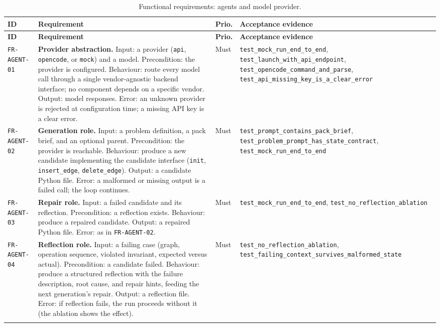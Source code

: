 \begin{longtable}{@{}>{\raggedright\arraybackslash}p{}>{\raggedright\arraybackslash}p{}p{}>{\raggedright\arraybackslash}p{}@{}}
\caption{Functional requirements: agents and model provider.}\label{tab:fr-agent}\\
\toprule
\textbf{ID} & \textbf{Requirement} & \textbf{Prio.} & \textbf{Acceptance evidence} \\
\midrule
\endfirsthead
\toprule
\textbf{ID} & \textbf{Requirement} & \textbf{Prio.} & \textbf{Acceptance evidence} \\
\midrule
\endhead
\bottomrule
\endfoot

\texttt{FR-AGENT-01} & \textbf{Provider abstraction.} Input: a provider
(\texttt{api}, \texttt{opencode}, or \texttt{mock}) and a model. Precondition: the
provider is configured. Behaviour: route every model call through a single
vendor-agnostic backend interface; no component depends on a specific vendor.
Output: model responses. Error: an unknown provider is rejected at configuration
time; a missing API key is a clear error. & Must &
\texttt{test\_mock\_run\_end\_to\_end}, \texttt{test\_launch\_with\_api\_endpoint},
\texttt{test\_opencode\_command\_and\_parse},
\texttt{test\_api\_missing\_key\_is\_a\_clear\_error} \\
\addlinespace[2pt]

\texttt{FR-AGENT-02} & \textbf{Generation role.} Input: a problem definition, a
pack brief, and an optional parent. Precondition: the provider is reachable.
Behaviour: produce a new candidate implementing the candidate interface
(\texttt{init}, \texttt{insert\_edge}, \texttt{delete\_edge}). Output: a candidate
Python file. Error: a malformed or missing output is a failed call; the loop
continues. & Must & \texttt{test\_prompt\_contains\_pack\_brief},
\texttt{test\_problem\_prompt\_has\_state\_contract},
\texttt{test\_mock\_run\_end\_to\_end} \\
\addlinespace[2pt]

\texttt{FR-AGENT-03} & \textbf{Repair role.} Input: a failed candidate and its
reflection. Precondition: a reflection exists. Behaviour: produce a repaired
candidate. Output: a repaired Python file. Error: as in \texttt{FR-AGENT-02}. &
Must & \texttt{test\_mock\_run\_end\_to\_end}, \texttt{test\_no\_reflection\_ablation} \\
\addlinespace[2pt]

\texttt{FR-AGENT-04} & \textbf{Reflection role.} Input: a failing case (graph,
operation sequence, violated invariant, expected versus actual). Precondition: a
candidate failed. Behaviour: produce a structured reflection with the failure
description, root cause, and repair hints, feeding the next generation's repair.
Output: a reflection file. Error: if reflection fails, the run proceeds without
it (the ablation shows the effect). & Must & \texttt{test\_no\_reflection\_ablation},
\texttt{test\_failing\_context\_survives\_malformed\_state} \\
\addlinespace[2pt]


\end{longtable}
